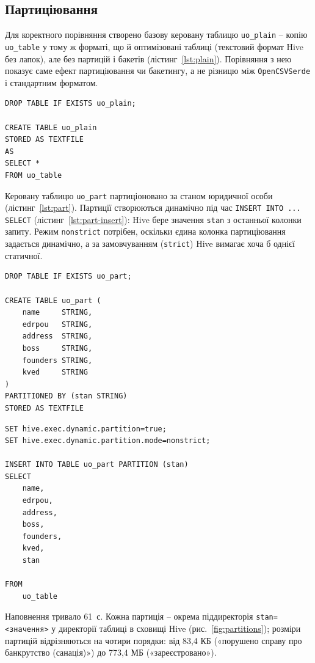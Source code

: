 \documentclass{iasa-lab}
\begin{document}
\subsection{Партиціювання}

Для коректного порівняння створено базову керовану таблицю \texttt{uo\_plain} -- копію \texttt{uo\_table} у тому ж форматі, що й оптимізовані таблиці (текстовий формат Hive без лапок), але без партицій і бакетів (лістинг~\ref{lst:plain}). Порівняння з нею показує саме ефект партиціювання чи бакетингу, а не різницю між \texttt{OpenCSVSerde} і стандартним форматом.

\begin{lstlisting}[language=HiveQL, caption={Базова керована таблиця uo\_plain}, label={lst:plain}]
DROP TABLE IF EXISTS uo_plain;

CREATE TABLE uo_plain
STORED AS TEXTFILE
AS
SELECT *
FROM uo_table
\end{lstlisting}

Керовану таблицю \texttt{uo\_part} партиціоновано за станом юридичної особи (лістинг~\ref{lst:part}). Партиції створюються динамічно під час \texttt{INSERT INTO ... SELECT} (лістинг~\ref{lst:part-insert}): Hive бере значення \texttt{stan} з останньої колонки запиту. Режим \texttt{nonstrict} потрібен, оскільки єдина колонка партиціювання задається динамічно, а за замовчуванням (\texttt{strict}) Hive вимагає хоча б однієї статичної.

\begin{lstlisting}[language=HiveQL, caption={Створення партиціонованої таблиці uo\_part}, label={lst:part}]
DROP TABLE IF EXISTS uo_part;

CREATE TABLE uo_part (
    name     STRING,
    edrpou   STRING,
    address  STRING,
    boss     STRING,
    founders STRING,
    kved     STRING
)
PARTITIONED BY (stan STRING)
STORED AS TEXTFILE
\end{lstlisting}

\begin{lstlisting}[language=HiveQL, caption={Наповнення таблиці uo\_part}, label={lst:part-insert}]
SET hive.exec.dynamic.partition=true;
SET hive.exec.dynamic.partition.mode=nonstrict;

INSERT INTO TABLE uo_part PARTITION (stan)
SELECT
    name,
    edrpou,
    address,
    boss,
    founders,
    kved,
    stan

FROM
    uo_table
\end{lstlisting}

Наповнення тривало 61~с. Кожна партиція -- окрема піддиректорія \texttt{stan=<значення>} у директорії таблиці в сховищі Hive (рис.~\ref{fig:partitions}); розміри партицій відрізняються на чотири порядки: від 83,4 КБ («порушено справу про банкрутство (санація)») до 773,4 МБ («зареєстровано»).
\end{document}
